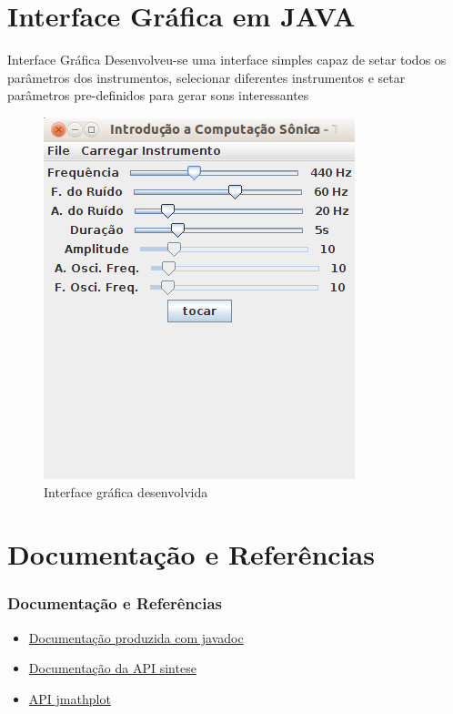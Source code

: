 \documentclass{beamer}
\begin{document}
\section{Interface Gráfica em JAVA}

\begin{frame}
	\begin{block}{Interface Gráfica}
	Desenvolveu-se uma interface simples capaz de setar todos
	os parâmetros dos instrumentos, selecionar diferentes instrumentos e
	setar parâmetros pre-definidos para gerar sons interessantes	
	\end{block}
 \begin{figure}
  \includegraphics[scale=0.4]{./images/interface.png}
  \caption{Interface gráfica desenvolvida}
 \end{figure} 
	
 
\end{frame}


\section{Documentação e Referências}
\begin{frame}
  \frametitle{Documentação e Referências}
  \begin{itemize}
  \item \href{/home/juarez408/Documents/GitHub/GitCode/UnB2014/ICS/Trabalho2/doc/index.html}{Documentação produzida com javadoc}
  \item \href{http://www.cic.unb.br/docentes/lcmm/sintese/javadoc/}{Documentação da API sintese}
  \item \href{https://code.google.com/p/jmathplot/}{API jmathplot}
  \end{itemize}
\end{frame}
\end{document}
